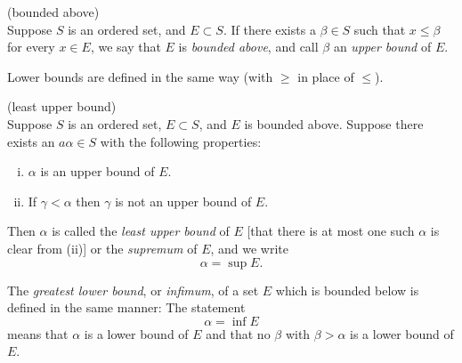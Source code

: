 
\begin{myDef}
    \label{myDef:1.7}
    (bounded above)\\
    Suppose $S$ is an ordered set, and $E \subset S$. 
    If there exists a $\beta \in S$ 
    such that $x \leq \beta$ for every $x \in E$, 
    we say that $E$ is \emph{bounded above}, and call
    $\beta$ an \emph{upper bound} of $E$.

    Lower bounds are defined in the same way (with $\geq$ in place of $\leq$).
\end{myDef}

\begin{myDef}
    \label{myDef:1.8}
    (least upper bound)\\
    Suppose $S$ is an ordered set, $E \subset S$, and $E$ is bounded above.
    Suppose there exists an $a\alpha \in S$ with the following properties:
    \begin{enumerate}[(i)]
        \item $\alpha$ is an upper bound of $E$.
        \item If $\gamma <\alpha$ then $\gamma$ is not an upper bound of $E$.
    \end{enumerate}

    Then $\alpha$ is called the \emph{least upper bound} of $E$ 
    [that there is at most one such $\alpha$ is clear from (ii)] 
    or the \emph{supremum} of $E$, and we write
    \begin{equation*}
        \alpha = \sup E.
    \end{equation*}

    The \emph{greatest lower bound}, or \emph{infimum}, 
    of a set $E$ which is bounded below is defined in the same manner: The statement
    \begin{equation*}
        \alpha = \inf E
    \end{equation*}
    means that $\alpha$ is a lower bound of $E$ and 
    that no $\beta$ with $\beta > \alpha$ is a lower bound
    of $E$.
\end{myDef}

